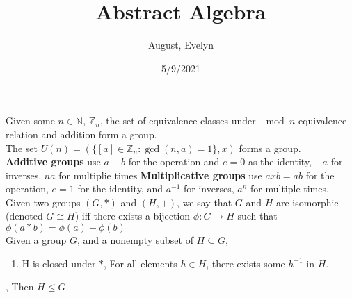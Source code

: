 \documentclass{article}
\title{Abstract Algebra}
\author{August, Evelyn}
\date{5/9/2021}
\newcommand{\N}{\mathbb{N}}
\newcommand{\Z}{\mathbb{Z}}
\begin{document}
 Given some $n\in \N$, $\Z_n$, the set of equivalence classes under $\mod n$ equivalence relation and addition form a group.\\

 The set $U(n) = (\{[a]\in \Z_n:\gcd(n,a) = 1\},x)$ forms a group.\\


 \textbf{Additive groups} use $a+b$ for the operation and $e = 0$ as the identity, $-a$ for inverses, $na$ for multiplie times \textbf{Multiplicative groups} use $axb = ab$ for the operation, $e = 1$ for the identity, and $a^{-1}$ for inverses, $a^n$ for multiple times.
\\

 Given two groups $(G,*)$ and $(H,+)$, we say that $G$ and $H$ are isomorphic (denoted $G\cong H$) iff there exists a bijection $\phi:G\rightarrow H$ such that $\phi(a*b) = \phi(a)+\phi(b)$\\

 Given a group $G$, and a nonempty subset of $H\subseteq G$, 
\begin{enumerate}
    \item H is closed under $*$,
    \tiem For all elements $h\in H$, there exists some $h^{-1}$ in $H$.
\end{enumerate},
Then $H\le G$.
\end{document}
